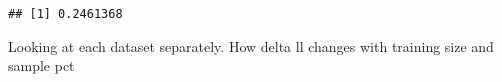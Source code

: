 \documentclass[
]{article}
\newenvironment{Shaded}{\begin{snugshade}}{\end{snugshade}}
\newcommand{\ControlFlowTok}[1]{\textcolor[rgb]{0.13,0.29,0.53}{\textbf{#1}}}
\newcommand{\DataTypeTok}[1]{\textcolor[rgb]{0.13,0.29,0.53}{#1}}
\newcommand{\KeywordTok}[1]{\textcolor[rgb]{0.13,0.29,0.53}{\textbf{#1}}}
\newcommand{\NormalTok}[1]{#1}
\newcommand{\OperatorTok}[1]{\textcolor[rgb]{0.81,0.36,0.00}{\textbf{#1}}}
\newcommand{\StringTok}[1]{\textcolor[rgb]{0.31,0.60,0.02}{#1}}
\begin{document}
\begin{verbatim}
## [1] 0.2461368
\end{verbatim}

Looking at each dataset separately. How delta ll changes with training
size and sample pct

\begin{Shaded}
\end{Shaded}
\end{document}
